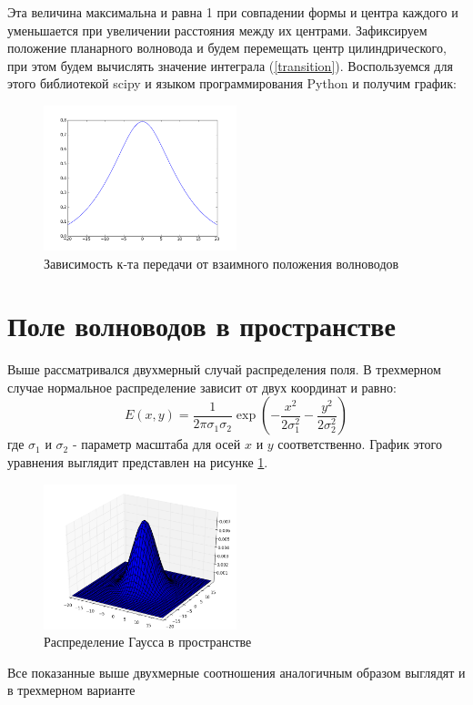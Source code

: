 Эта величина максимальна и равна 1 при совпадении формы и центра каждого и уменьшается при увеличении расстояния между их центрами. Зафиксируем положение планарного волновода и будем перемещать центр цилиндрического, при этом будем вычислять значение интеграла (\ref{transition}). Воспользуемся для этого библиотекой scipy и языком программирования Python и получим график:
\begin{figure}[h!]
	\includegraphics[width=0.5\textwidth]{img/transition.png}
	\caption{Зависимость к-та передачи от взаимного положения волноводов}
\end{figure}

\section{Поле волноводов в пространстве}

Выше рассматривался двухмерный случай распределения поля. В трехмерном случае нормальное распределение зависит от двух координат и равно:
\begin{equation}
  \label{gauss3d}
  E(x,y)=\frac{1}{2\pi\sigma_1\sigma_2}\exp\left(-\frac{x^2}{2\sigma_1^2}-\frac{y^2}{2\sigma_2^2}\right)
\end{equation}
где $\sigma_1$ и $\sigma_2$ - параметр масштаба для осей $x$ и $y$ соответственно. График этого уравнения выглядит представлен на рисунке \ref{gauss3dPlot}.

\begin{figure}[h!]
	\includegraphics[width=0.5\textwidth]{img/gauss3d.png}
	\caption{Распределение Гаусса в пространстве}
	\label{gauss3dPlot}
\end{figure}

Все показанные выше двухмерные соотношения аналогичным образом выглядят и в трехмерном варианте
